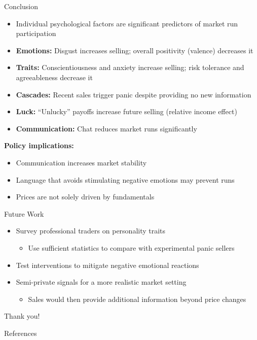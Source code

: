 \documentclass{beamer}
\begin{document}
\begin{frame}{Conclusion}
\begin{itemize}
    \item Individual psychological factors are significant predictors of market run participation
    \item \textbf{Emotions:} Disgust increases selling; overall positivity (valence) decreases it
    \item \textbf{Traits:} Conscientiousness and anxiety increase selling; risk tolerance and agreeableness decrease it
    \item \textbf{Cascades:} Recent sales trigger panic despite providing no new information
    \item \textbf{Luck:} ``Unlucky'' payoffs increase future selling (relative income effect)
    \item \textbf{Communication:} Chat reduces market runs significantly
\end{itemize}

\vspace{0.3cm}
\textbf{Policy implications:}
\begin{itemize}
    \item Communication increases market stability
    \item Language that avoids stimulating negative emotions may prevent runs
    \item Prices are not solely driven by fundamentals
\end{itemize}
\end{frame}


\begin{frame}{Future Work}
\begin{itemize}
    \item Survey professional traders on personality traits
    \begin{itemize}
        \item Use sufficient statistics to compare with experimental panic sellers
    \end{itemize}
    \item Test interventions to mitigate negative emotional reactions
    \item Semi-private signals for a more realistic market setting
    \begin{itemize}
        \item Sales would then provide additional information beyond price changes
    \end{itemize}
\end{itemize}

\vspace{1cm}
\centering
\Large Thank you!
\end{frame}


\begin{frame}[allowframebreaks]{References}

\scriptsize

\end{frame}
\end{document}
